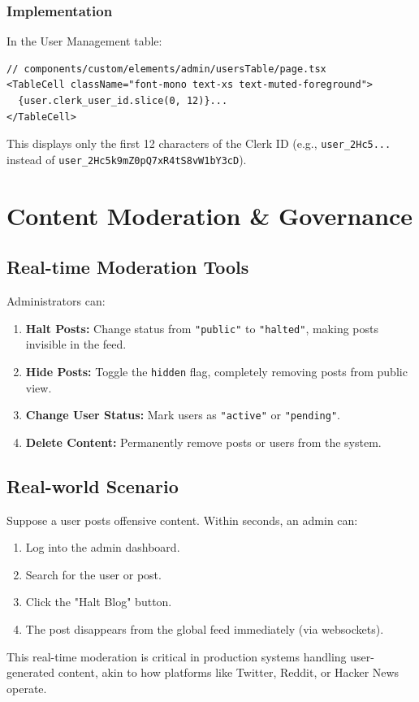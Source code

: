 \documentclass[11pt,a4paper]{article}
\begin{document}
\subsubsection{Implementation}
In the User Management table:
\begin{lstlisting}
// components/custom/elements/admin/usersTable/page.tsx
<TableCell className="font-mono text-xs text-muted-foreground">
  {user.clerk_user_id.slice(0, 12)}...
</TableCell>
\end{lstlisting}

This displays only the first 12 characters of the Clerk ID (e.g., \texttt{user\_2Hc5...} instead of \texttt{user\_2Hc5k9mZ0pQ7xR4tS8vW1bY3cD}).

\section{Content Moderation \& Governance}

\subsection{Real-time Moderation Tools}
Administrators can:
\begin{enumerate}
    \item \textbf{Halt Posts:} Change status from \texttt{"public"} to \texttt{"halted"}, making posts invisible in the feed.
    \item \textbf{Hide Posts:} Toggle the \texttt{hidden} flag, completely removing posts from public view.
    \item \textbf{Change User Status:} Mark users as \texttt{"active"} or \texttt{"pending"}.
    \item \textbf{Delete Content:} Permanently remove posts or users from the system.
\end{enumerate}

\subsection{Real-world Scenario}
Suppose a user posts offensive content. Within seconds, an admin can:
\begin{enumerate}
    \item Log into the admin dashboard.
    \item Search for the user or post.
    \item Click the "Halt Blog" button.
    \item The post disappears from the global feed immediately (via websockets).
\end{enumerate}
This real-time moderation is critical in production systems handling user-generated content, akin to how platforms like Twitter, Reddit, or Hacker News operate.
\end{document}

